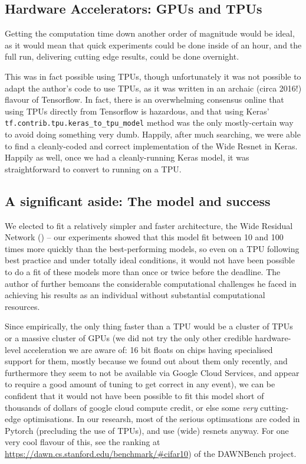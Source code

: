 \documentclass[10pt,twocolumn,letterpaper]{article}
\begin{document}
	\subsection{Hardware Accelerators: GPUs and TPUs}
		Getting the computation time down another order of magnitude would be ideal, as it would mean that quick experiments could be done inside of an hour, and the full run, delivering cutting edge results, could be done overnight.

		This was in fact possible using TPUs, though unfortunately it was not possible to adapt the \cite{Cubuk2018} author's code to use TPUs, as it was written in an archaic (circa 2016!) flavour of Tensorflow. In fact, there is an overwhelming consensus online that using TPUs directly from Tensorflow is hazardous, and that using Keras' \texttt{tf.contrib.tpu.keras\_to\_tpu\_model} method was the only mostly-certain way to avoid doing something very dumb. Happily, after much searching, we were able to find a cleanly-coded and correct implementation of the Wide Resnet in Keras. Happily as well, once we had a cleanly-running Keras model, it was straightforward to convert to running on a TPU.

	\subsection{A significant aside: The model and success}
		We elected to fit a relatively simpler and faster architecture, the Wide Residual Network (\cite{Zagoruyko2016}) -- our experiments showed that this model fit between 10 and 100 times more quickly than the best-performing models, so even on a TPU following best practice and under totally ideal conditions, it would not have been possible to do a fit of these models more than once or twice before the deadline. The author of \cite{Gastaldi2017} further bemoans the considerable computational challenges he faced in achieving his results as an individual without substantial computational resources.

		Since empirically, the only thing faster than a TPU would be a cluster of TPUs or a massive cluster of GPUs (we did not try the only other credible hardware-level acceleration we are aware of: 16 bit floats on chips having specialised support for them, mostly because we found out about them only recently, and furthermore they seem to not be available via Google Cloud Services, and appear to require a good amount of tuning to get correct in any event), we can be confident that it would not have been possible to fit this model short of thousands of dollars of google cloud compute credit, or else some \emph{very} cutting-edge optimisations. In our researsh, most of the serious optimsations are coded in Pytorch (precluding the use of TPUs), and use (wide) resnets anyway. For one very cool flavour of this, see the ranking at \url{https://dawn.cs.stanford.edu/benchmark/#cifar10}) of the \cite{Coleman2017} DAWNBench project.
\end{document}
